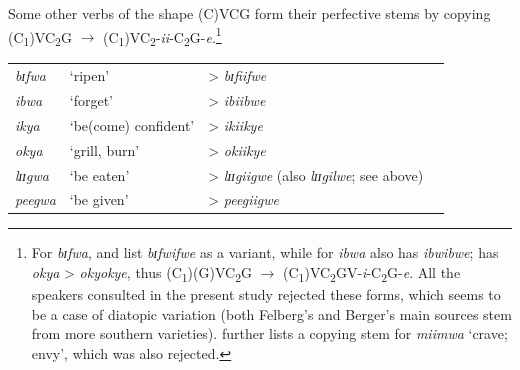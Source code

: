 Some other verbs of the shape (C)VCG form their perfective stems by copying (C\textsubscript{1})VC\textsubscript{2}G $\rightarrow$ (C\textsubscript{1})VC\textsubscript{2}-\textit{ii}-C\textsubscript{2}G-\textit{e}.\footnote{For \textit{bɪfwa}, \citet{BergerP1938} and \citet{FelbergK1996} list \textit{bɪfwifwe} as a variant, while for \textit{ibwa} \citet{BergerP1938} also has \textit{ibwibwe}; \citet{NurseD1979} has \textit{okya} > \textit{okyokye}, thus (C\textsubscript{1})(G)VC\textsubscript{2}G $\rightarrow$ (C\textsubscript{1})VC\textsubscript{2}GV-\textit{i}-C\textsubscript{2}G-\textit{e}. All the speakers consulted in the present study rejected these forms, which seems to be a case of diatopic variation (both Felberg's and Berger's main sources stem from more southern varieties). \citet{FelbergK1996} further lists a copying stem for \textit{miimwa} \lq crave; envy', which was also rejected.}
\begin{exe}
\ex
\begin{tabular}[t]{@{}>{\itshape}llll}
\textit{bɪfwa}&`ripen'& > \textit{bɪfiifwe}
\\\textit{ibwa}&`forget'& > \textit{ibiibwe}
\\\textit{ikya}&`be(come) confident'& > \textit{ikiikye}
\\\textit{okya}&`grill, burn'& > \textit{okiikye}
\\\textit{lɪɪgwa}&`be eaten'& > \textit{lɪɪgiigwe} (also \textit{lɪɪgilwe}; see above)
\\\textit{peegwa}&`be given'& > \textit{peegiigwe}
\end{tabular}
\end{exe} 


